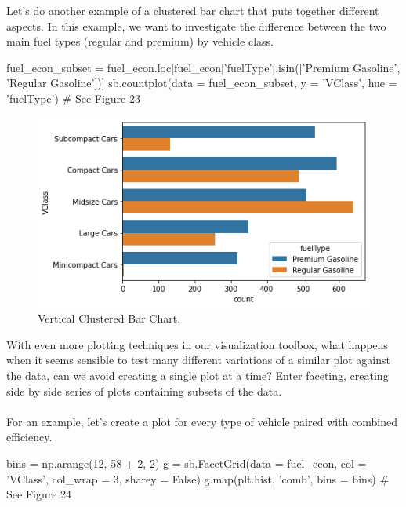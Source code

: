 Let's do another example of a clustered bar chart that puts together different aspects. In this example, we want to investigate the difference between the two main fuel types (regular and premium) by vehicle class.

\begin{python}
	fuel_econ_subset = fuel_econ.loc[fuel_econ['fuelType'].isin(['Premium Gasoline', 'Regular Gasoline'])]
	sb.countplot(data = fuel_econ_subset, y = 'VClass', hue = 'fuelType')
	# See Figure 23
\end{python}

\begin{figure}
	\includegraphics{images/figure23.png}
	\caption{Vertical Clustered Bar Chart.}\label{fig:figure23}
\end{figure}

\newpage
With even more plotting techniques in our visualization toolbox, what happens when it seems sensible to test many different variations of a similar plot against the data, can we avoid creating a single plot at a time? Enter faceting, creating side by side series of plots containing subsets of the data.
\\\\

For an example, let's create a plot for every type of vehicle paired with combined efficiency.

\begin{python}
	bins = np.arange(12, 58 + 2, 2)
	g = sb.FacetGrid(data = fuel_econ, col = 'VClass', col_wrap = 3, sharey = False)
	g.map(plt.hist, 'comb', bins = bins)
	# See Figure 24
\end{python}

